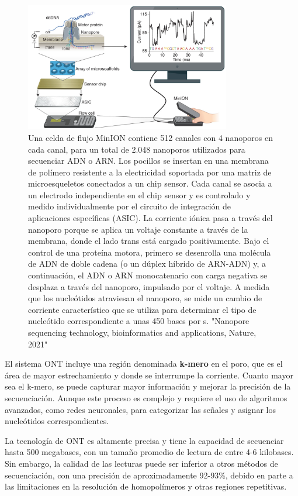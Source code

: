 \begin{figure}[htbp]
\centering
\includegraphics[width = 0.8\textwidth]{figs/nanopore.png}
\caption{Una celda de flujo MinION contiene 512 canales con 4 nanoporos en cada canal, para un total de 2.048 nanoporos utilizados para secuenciar ADN o ARN. Los pocillos se insertan en una membrana de polímero resistente a la electricidad soportada por una matriz de microesqueletos conectados a un chip sensor. Cada canal se asocia a un electrodo independiente en el chip sensor y es controlado y medido individualmente por el circuito de integración de aplicaciones específicas (ASIC). La corriente iónica pasa a través del nanoporo porque se aplica un voltaje constante a través de la membrana, donde el lado trans está cargado positivamente. Bajo el control de una proteína motora, primero se desenrolla una molécula de ADN de doble cadena (o un dúplex híbrido de ARN-ADN) y, a continuación, el ADN o ARN monocatenario con carga negativa se desplaza a través del nanoporo, impulsado por el voltaje. A medida que los nucleótidos atraviesan el nanoporo, se mide un cambio de corriente característico que se utiliza para determinar el tipo de nucleótido correspondiente a unas 450 bases por s. "Nanopore sequencing technology, bioinformatics and applications, Nature, 2021"}
\end{figure}

El sistema ONT incluye una región denominada \textbf{k-mero} en el poro, que es el área de mayor estrechamiento y donde se interrumpe la corriente. Cuanto mayor sea el k-mero, se puede capturar mayor información y mejorar la precisión de la secuenciación. Aunque este proceso es complejo y requiere el uso de algoritmos avanzados, como redes neuronales, para categorizar las señales y asignar los nucleótidos correspondientes.

La tecnología de ONT es altamente precisa y tiene la capacidad de secuenciar hasta 500 megabases, con un tamaño promedio de lectura de entre 4-6 kilobases. Sin embargo, la calidad de las lecturas puede ser inferior a otros métodos de secuenciación, con una precisión de aproximadamente 92-93\%, debido en parte a las limitaciones en la resolución de homopolímeros y otras regiones repetitivas.

